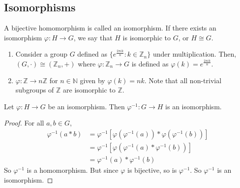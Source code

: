 \subsection{Isomorphisms}
A bijective homomorphism is called an isomorphism. If there exists an isomorphism $\varphi: H \to G$, we say that $H$ is isomorphic to $G$, or $H \cong G$.
\begin{enumerate}
	\item Consider a group $G$ defined as $\{ e^{\frac{2 \pi i k}{n}} : k \in \mathbb Z_n \}$ under multiplication. Then, $(G, \cdot) \cong (\mathbb Z_n, +)$ where $\varphi: \mathbb Z_n \to G$ is defined as $\varphi(k) = e^{\frac{2\pi i k}{n}}$.
	\item $\varphi: \mathbb Z \to n\mathbb Z$ for $n \in \mathbb N$ given by $\varphi(k) = nk$. Note that all non-trivial subgroups of $\mathbb Z$ are isomorphic to $\mathbb Z$.
\end{enumerate}

\begin{proposition}
	Let $\varphi: H \to G$ be an isomorphism. Then $\varphi^{-1}: G \to H$ is an isomorphism.
\end{proposition}
\begin{proof}
	For all $a, b \in G$,
	\begin{align*}
		\varphi^{-1}(a \ast b) & = \varphi^{-1}\left[ \varphi(\varphi^{-1}(a)) \ast \varphi(\varphi^{-1}(b)) \right] \\
		                       & = \varphi^{-1}\left[ \varphi(\varphi^{-1}(a) \ast \varphi^{-1}(b)) \right]          \\
		                       & = \varphi^{-1}(a) \ast \varphi^{-1}(b)
	\end{align*}
	So $\varphi^{-1}$ is a homomorphism. But since $\varphi$ is bijective, so is $\varphi^{-1}$. So $\varphi^{-1}$ is an isomorphism.
\end{proof}
